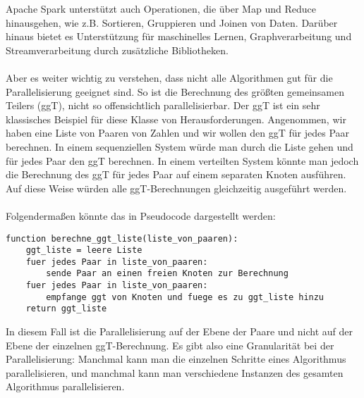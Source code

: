 Apache Spark unterstützt auch Operationen, die über Map und Reduce hinausgehen, wie z.B. Sortieren, Gruppieren und Joinen von Daten. Darüber hinaus bietet es Unterstützung für maschinelles Lernen, Graphverarbeitung und Streamverarbeitung durch zusätzliche Bibliotheken.
\\\\
Aber es weiter wichtig zu verstehen, dass nicht alle Algorithmen gut für die Parallelisierung geeignet sind.  So ist die Berechnung des größten gemeinsamen Teilers (ggT), nicht so offensichtlich parallelisierbar. Der ggT ist ein sehr klassisches Beispiel für diese Klasse von Herausforderungen.
Angenommen, wir haben eine Liste von Paaren von Zahlen und wir wollen den ggT für jedes Paar berechnen. In einem sequenziellen System würde man durch die Liste gehen und für jedes Paar den ggT berechnen. In einem verteilten System könnte man jedoch die Berechnung des ggT für jedes Paar auf einem separaten Knoten ausführen. Auf diese Weise würden alle ggT-Berechnungen gleichzeitig ausgeführt werden.
\\\\
Folgendermaßen könnte das in Pseudocode dargestellt werden:
\begin{lstlisting}[caption={ggT},captionpos=b,label={lst:ggt}]
function berechne_ggt_liste(liste_von_paaren):
    ggt_liste = leere Liste
    fuer jedes Paar in liste_von_paaren:
        sende Paar an einen freien Knoten zur Berechnung
    fuer jedes Paar in liste_von_paaren:
        empfange ggt von Knoten und fuege es zu ggt_liste hinzu
    return ggt_liste
\end{lstlisting}
In diesem Fall ist die Parallelisierung auf der Ebene der Paare und nicht auf der Ebene der einzelnen ggT-Berechnung. Es gibt also eine Granularität bei der Parallelisierung: Manchmal kann man die einzelnen Schritte eines Algorithmus parallelisieren, und manchmal kann man verschiedene Instanzen des gesamten Algorithmus parallelisieren.
